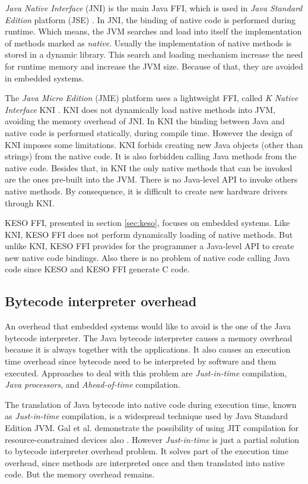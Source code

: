 \documentclass[12pt]{article} %
\begin{document}
\emph{Java Native Interface} (JNI) is the main Java FFI, which is used in \emph{Java Standard Edition} platform (JSE) \cite{Liang:1999}. In JNI, the binding of native code is performed during runtime. Which means, the JVM searches and load into itself the implementation of methods marked as \emph{native}. Usually the implementation of native methods is stored in a dynamic library. This search and loading mechanism increase the need for runtime memory and increase the JVM size. Because of that, they are avoided in embedded systems.

The \emph{Java Micro Edition} (JME) platform uses a lightweight FFI, called \emph{K Native Interface} KNI \cite{_k_2002}. KNI does not dynamically load native methods into JVM, avoiding the memory overhead of JNI. In KNI the binding between Java and native code is performed statically, during compile time. However the design of KNI imposes some limitations. KNI forbids creating new Java objects (other than strings) from the native code. It is also forbidden calling Java methods from the native code. Besides that, in KNI the only native methods that can be invoked are the ones pre-built into the JVM. There is no Java-level API to invoke others native methods. By consequence, it is difficult to create new hardware drivers through KNI.

KESO FFI, presented in section \ref{sec:keso}, focuses on embedded systems. Like KNI, KESO FFI does not perform dynamically loading of native methods. But unlike KNI, KESO FFI provides for the programmer a Java-level API to create new native code bindings. Also there is no problem of native code calling Java code since KESO and KESO FFI generate C code.

\subsection{Bytecode interpreter overhead}
	An overhead that embedded systems would like to avoid is the one of
the Java bytecode interpreter. The Java bytecode interpreter causes a memory
overhead because it is always together with the applications. It also causes
an execution time overhead since bytecode need to be interpreted by software
and them executed. Approaches to deal with this problem are \emph{Just-in-time}
compilation, \emph{Java processors}, and \emph{Ahead-of-time} compilation.

The translation of Java bytecode into native code during execution time, known as 
\emph{Just-in-time} compilation, is a widespread technique used by Java 
Standard Edition JVM.
Gal et al. demonstrate the possibility of using JIT compilation for 
resource-constrained devices also \cite{1134780}.
However \emph{Just-in-time} is just a partial solution to bytecode interpreter
overhead problem. It solves part of the execution time overhead, since methods
are interpreted once and then translated into native code. But the memory 
overhead remains.
\end{document}
